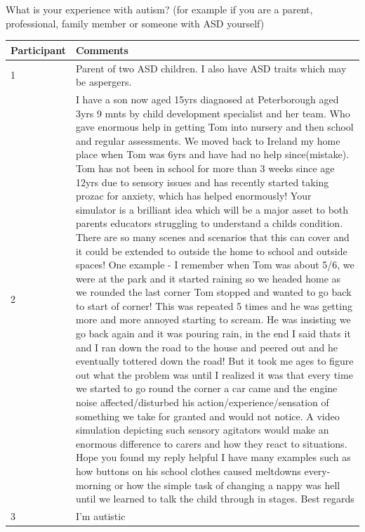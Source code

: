 \documentclass[11pt]{report}
\begin{document}
What is your experience with autism? (for example if you are a parent, professional, family member or someone with ASD yourself)
\begin{table}[H]
    \begin{tabular}{| p{3cm} | p{12cm} |}
    \hline
     Participant & Comments \\ \hline
     1 & Parent of two ASD children. I also have ASD traits which may be aspergers. \\ \hline
     2 & I have a son now aged 15yrs diagnosed at Peterborough aged 3yrs 9 mnts by child development specialist and her team. Who gave enormous help in getting Tom into nursery and then school and regular assessments. We moved back to Ireland my home place when Tom was 6yrs and have had no help since(mistake). Tom has not been in school for more than 3 weeks since age 12yrs due to sensory issues and has recently started taking prozac for anxiety, which has helped enormously! Your simulator is a brilliant idea which will be a major asset to both parents educators struggling to understand a childs condition. There are so many scenes and scenarios that this can cover and it could be extended to outside the home to school and outside spaces! One example - I remember when Tom was about 5/6, we were at the park and it started raining so we headed home as we rounded the last corner Tom stopped and wanted to go back to start of corner! This was repeated 5 times and he was getting more and more annoyed starting to scream. He was insisting we go back again and it was pouring rain, in the end I said thats it and I ran down the road to the house and peered out and he eventually tottered down the road! But it took me ages to figure out what the problem was until I realized it was that every time we started to go round the corner a car came and the engine noise affected/disturbed his action/experience/sensation of something we take for granted and would not notice. A video simulation depicting such sensory agitators would make an enormous difference to carers and how they react to situations. Hope you found my reply helpful I have many examples such as how buttons on his school clothes caused meltdowns every-morning or how the simple task of changing a nappy was hell until we learned to talk the child through in stages. Best regards  \\ \hline
     3 &  I'm autistic  \\ \hline
    \end{tabular}
\end{table}
\end{document}
